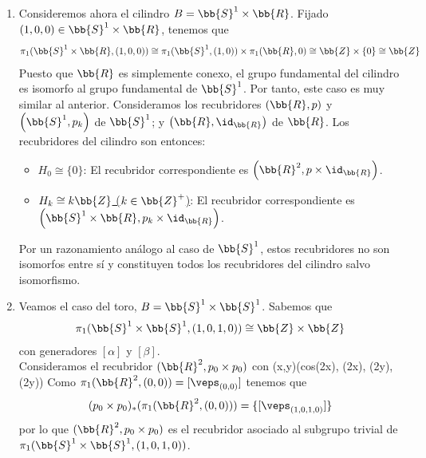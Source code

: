 \begin{ejemplo}
\begin{enumerate}
        \item Consideremos ahora el cilindro $B=\bb{S}^1\times \bb{R}$. Fijado $(1,0,0)\in \bb{S}^1\times \bb{R}$, tenemos que
        \begin{gather*}
            \pi_1(\bb{S}^1\times \bb{R}, (1,0,0)) \cong \pi_1(\bb{S}^1, (1,0)) \times \pi_1(\bb{R}, 0) \cong \bb{Z} \times \{0\} \cong \bb{Z}
        \end{gather*}
        Puesto que $\bb{R}$ es simplemente conexo, el grupo fundamental del cilindro es isomorfo al grupo fundamental de $\bb{S}^1$. Por tanto, este caso es muy similar al anterior. Consideramos los recubridores $\left(\bb{R}, p\right)$ y $\left(\bb{S}^1, p_k\right)$ de $\bb{S}^1$; y $\left(\bb{R}, \id_{\bb{R}}\right)$ de $\bb{R}$. Los recubridores del cilindro son entonces:
        \begin{itemize}
            \item \ul{$H_0 \cong \{0\}$}: El recubridor correspondiente es $\left(\bb{R}^2, p\times \id_{\bb{R}}\right)$.
            \item \ul{$H_k \cong k\bb{Z}$ ($k\in \bb{Z}^+$)}: El recubridor correspondiente es $\left(\bb{S}^1\times \bb{R}, p_k\times \id_{\bb{R}}\right)$.
        \end{itemize}
        
        Por un razonamiento análogo al caso de $\bb{S}^1$, estos recubridores no son isomorfos entre sí y constituyen todos los recubridores del cilindro salvo isomorfismo.

        

        \item Veamos el caso del toro, $B=\bb{S}^1 \times \bb{S}^1$. Sabemos que 
        \begin{gather*}
            \pi_1(\bb{S}^1\times \bb{S}^1, (1,0,1,0)) \cong \bb{Z}\times \bb{Z}
        \end{gather*}
        con generadores $[\alpha]$ y $[\beta]$.\\
        Consideramos el recubridor $(\bb{R}^2, p_0\times p_0)$ con 
             {(x,y)}{(cos(2\pi x), \sen(2\pi x), \cos(2\pi y), \sen(2\pi y))}
        Como $\pi_1(\bb{R}^2, (0,0)) = [\veps_{(0,0)}]$ tenemos que 
        \begin{gather*}
            (p_0\times p_0)_*(\pi_1(\bb{R}^2, (0,0))) = \{[\veps_{(1,0,1,0)}]\}
        \end{gather*}
        por lo que $(\bb{R}^2, p_0\times p_0)$ es el recubridor asociado al subgrupo trivial de $\pi_1(\bb{S}^1\times \bb{S}^1, (1,0,1,0))$.\\


\end{enumerate}
\end{ejemplo}
